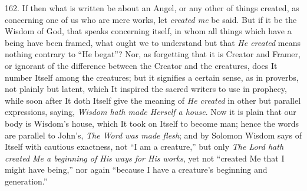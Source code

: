 162. If then what is written
be about an Angel, or any other of things created, as concerning one
of us who are mere works, let \emph{created me} be said. But if it be
the Wisdom of God, that speaks concerning itself, in whom all things
which have a being have been framed, what ought we to understand but
that \emph{He created} means nothing contrary to ``He begat''? Nor, as
forgetting that it is Creator and Framer, or ignorant of the
difference between the Creator and the creatures, does It number
Itself among the creatures; but it signifies a certain sense, as in
proverbs, not plainly but latent, which It inspired the sacred writers
to use in prophecy, while soon after It doth Itself give the meaning
of \emph{He created} in other but parallel expressions, saying, \emph{Wisdom
hath made Herself a house}. Now it is plain that our body is Wisdom's
house, which It took on Itself to become man; hence the words are
parallel to John's, \emph{The Word was made flesh}; and by Solomon
Wisdom says of Itself with cautious exactness, not ``I am a
creature,'' but only \emph{The Lord hath created Me a beginning of His
ways for His works}, yet not ``created Me that I might have being,''
nor again ``because I have a creature's beginning and generation.''

